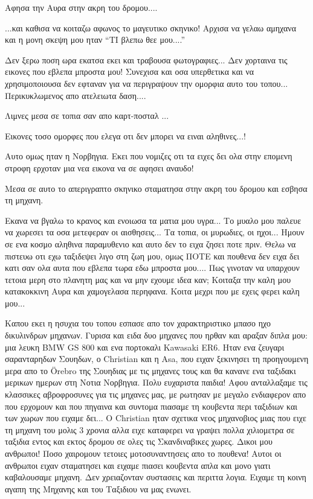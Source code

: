 
Αφησα την Αυρα στην ακρη του δρομου.... 


...και καθισα να κοιταζω αφωνος το μαγευτικο σκηνικο! Αρχισα να γελαω αμηχανα και η μονη σκεψη μου ηταν ``ΤΙ βλεπω θεε μου....''


Δεν ξερω ποση ωρα εκατσα εκει και τραβουσα φωτογραφιες... Δεν χορταινα τις εικονες που εβλεπα μπροστα μου!
Συνεχισα και οσα υπερθετικα και να χρησιμοποιουσα δεν εφταναν για να περιγραψουν την ομορφια αυτο του τοπου...
Περικυκλωμενος απο ατελειωτα δαση....


Λιμνες μεσα σε τοπια σαν απο καρτ-ποσταλ ...


Εικονες τοσο ομορφες που ελεγα οτι δεν μπορει να ειναι αληθινες...!


Αυτο ομως ηταν η Νορβηγια. Εκει που νομιζες οτι τα ειχες δει ολα στην επομενη στροφη ερχοταν μια νεα εικονα να σε αφησει αναυδο!


Μεσα σε αυτο το απεριγραπτο σκηνικο σταματησα στην ακρη του δρομου και εσβησα τη μηχανη. 


Εκανα να βγαλω το κρανος και ενοιωσα τα ματια μου υγρα... Το μυαλο μου παλευε να χωρεσει τα οσα μετεφεραν οι αισθησεις... Τα τοπια, οι μυρωδιες, οι ηχοι... Ημουν σε ενα κοσμο αληθινα παραμυθενιο και αυτο δεν το ειχα ζησει ποτε πριν. Θελω να πιστευω οτι εχω ταξιδεψει λιγο στη ζωη μου, ομως ΠΟΤΕ και πουθενα δεν ειχα δει κατι σαν ολα αυτα που εβλεπα τωρα εδω μπροστα μου....
Πως γινοταν να υπαρχουν τετοια μερη στο πλανητη μας και να μην εχουμε ιδεα καν;
Κοιταξα την καλη μου κατακοκκινη Αυρα και χαμογελασα περηφανα. Κοιτα μεχρι που με εχεις φερει καλη μου...

Καπου εκει η ησυχια του τοπου εσπασε απο τον χαρακτηριστικο μπασο ηχο δικυλινδρων μηχανων. Γυρισα και ειδα δυο μηχανες που ηρθαν και αραξαν διπλα μου: μια λευκη BMW GS 800 και ενα πορτοκαλι Kawasaki ER6. Ηταν ενα ζευγαρι σαρανταρηδων Σουηδων, ο Christian και η Asa, που ειχαν ξεκινησει τη προηγουμενη μερα απο το Örebro της Σουηδιας με τις μηχανες τους και θα κανανε ενα ταξιδακι μερικων ημερων στη Νοτια Νορβηγια. Πολυ ευχαριστα παιδια! Αφου ανταλλαξαμε τις κλασσικες αβροφροσυνες για τις μηχανες μας, με ρωτησαν με μεγαλο ενδιαφερον απο που ερχομουν και που πηγαινα και συντομα πιασαμε τη κουβεντα περι ταξιδιων και των χωρων που ειχαμε δει... 
Ο Christian ηταν σχετικα νεος μηχανοβιος μιας που ειχε τη μηχανη του μολις 3 χρονια αλλα ειχε καταφερει να γραψει πολλα χιλιομετρα σε ταξιδια εντος και εκτος δρομου σε ολες τις Σκανδιναβικες χωρες. Δικοι μου ανθρωποι! 
Ποσο χαιρομουν τετοιες μοτοσυναντησεις απο το πουθενα! Αυτοι οι ανθρωποι ειχαν σταματησει και ειχαμε πιασει κουβεντα απλα και μονο γιατι καβαλουσαμε μηχανη. Δεν χρειαζονταν συστασεις και περιττα λογια. Ειχαμε τη κοινη αγαπη της Μηχανης και του Ταξιδιου να μας ενωνει.


